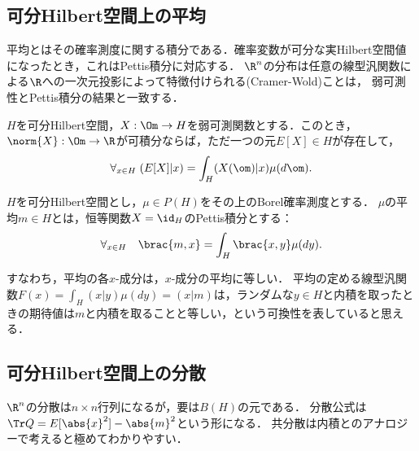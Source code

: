 \documentclass[uplatex,dvipdfmx]{jsreport}
\begin{document}
\subsection{可分Hilbert空間上の平均}

\begin{tcolorbox}[colframe=ForestGreen, colback=ForestGreen!10!white,breakable,colbacktitle=ForestGreen!40!white,coltitle=black,fonttitle=\bfseries\sffamily,
title=]
    平均とはその確率測度に関する積分である．確率変数が可分な実Hilbert空間値になったとき，これはPettis積分に対応する．
    $\R^n$の分布は任意の線型汎関数による$\R$への一次元投影によって特徴付けられる(Cramer-Wold)ことは，
    弱可測性とPettis積分の結果と一致する．
\end{tcolorbox}

\begin{proposition}
    $H$を可分Hilbert空間，$X:\Om\to H$を弱可測関数とする．このとき，$\norm{X}:\Om\to\R$が可積分ならば，ただ一つの元$E[X]\in H$が存在して，
    \[\forall_{x\in H}\;(E[X]|x)=\int_H (X(\om)|x)\mu(d\om).\]
\end{proposition}


\begin{definition}[平均]
    $H$を可分Hilbert空間とし，$\mu\in P(H)$をその上のBorel確率測度とする．
    $\mu$の平均$m\in H$とは，恒等関数$X=\id_H$のPettis積分とする：
    \[\forall_{x\in H}\quad\brac{m,x}=\int_H\brac{x,y}\mu(dy).\]
\end{definition}
\begin{remarks}
    すなわち，平均の各$x$-成分は，$x$-成分の平均に等しい．
    平均の定める線型汎関数$F(x)=\int_H(x|y)\mu(dy)=(x|m)$は，ランダムな$y\in H$と内積を取ったときの期待値は$m$と内積を取ることと等しい，という可換性を表していると思える．
\end{remarks}

\subsection{可分Hilbert空間上の分散}

\begin{tcolorbox}[colframe=ForestGreen, colback=ForestGreen!10!white,breakable,colbacktitle=ForestGreen!40!white,coltitle=black,fonttitle=\bfseries\sffamily,
title=]
    $\R^n$の分散は$n\times n$行列になるが，要は$B(H)$の元である．
    分散公式は$\Tr Q=E[\abs{x}^2]-\abs{m}^2$という形になる．
    共分散は内積とのアナロジーで考えると極めてわかりやすい．
\end{tcolorbox}
\end{document}
